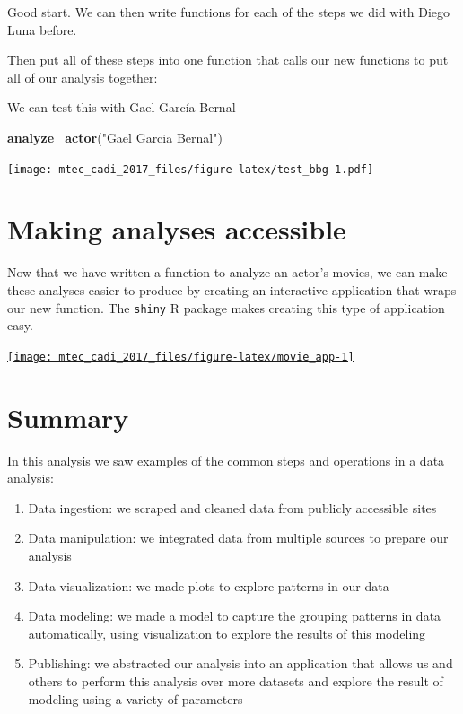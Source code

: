 \documentclass[12pt,]{book}
\newenvironment{Shaded}{\begin{snugshade}}{\end{snugshade}}
\newcommand{\KeywordTok}[1]{\textcolor[rgb]{0.13,0.29,0.53}{\textbf{#1}}}
\newcommand{\StringTok}[1]{\textcolor[rgb]{0.31,0.60,0.02}{#1}}
\newcommand{\NormalTok}[1]{#1}
\theoremstyle{definition}
\theoremstyle{definition}
\theoremstyle{remark}
\begin{document}
Good start. We can then write functions for each of the steps we did
with Diego Luna before.

Then put all of these steps into one function that calls our new
functions to put all of our analysis together:

We can test this with Gael García Bernal

\begin{Shaded}
\begin{Highlighting}[]
\KeywordTok{analyze_actor}\NormalTok{(}\StringTok{"Gael Garcia Bernal"}\NormalTok{)}
\end{Highlighting}
\end{Shaded}

\texttt{[image: mtec\_cadi\_2017\_files/figure-latex/test\_bbg-1.pdf]}

\section{Making analyses accessible}\label{making-analyses-accessible}

Now that we have written a function to analyze an actor's movies, we can
make these analyses easier to produce by creating an interactive
application that wraps our new function. The \texttt{shiny} R package
makes creating this type of application easy.

\begin{center}\href{https://hcorrada.shinyapps.io/movie_app/}{\texttt{[image: mtec\_cadi\_2017\_files/figure-latex/movie\_app-1]} }\end{center}

\section{Summary}\label{summary}

In this analysis we saw examples of the common steps and operations in a
data analysis:

\begin{enumerate}
\def\labelenumi{\arabic{enumi})}
\item
  Data ingestion: we scraped and cleaned data from publicly accessible
  sites
\item
  Data manipulation: we integrated data from multiple sources to prepare
  our analysis
\item
  Data visualization: we made plots to explore patterns in our data
\item
  Data modeling: we made a model to capture the grouping patterns in
  data automatically, using visualization to explore the results of this
  modeling
\item
  Publishing: we abstracted our analysis into an application that allows
  us and others to perform this analysis over more datasets and explore
  the result of modeling using a variety of parameters
\end{enumerate}
\end{document}
